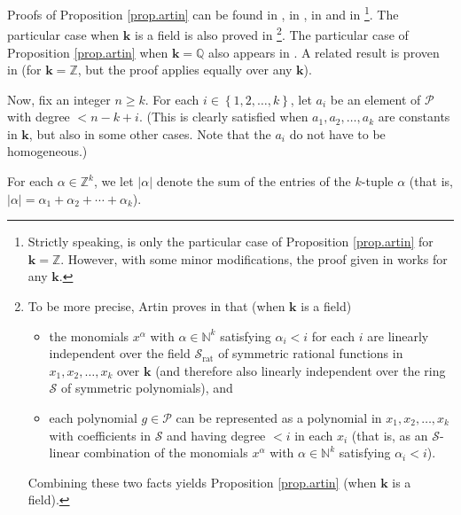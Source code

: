 \documentclass[numbers=enddot,12pt,final,onecolumn,notitlepage]{scrartcl}%
\theoremstyle{definition}
\begin{document}
Proofs of Proposition \ref{prop.artin} can be found in \cite[(DIFF.1.3)]%
{LLPT95}, in \cite[Chapter IV, \S 6, no. 1, Theorem 1 c)]{Bourba03}, in
\cite[Theorem, part (c)]{Gailla21} and in \cite[(5.1)]{Macdon91}%
\footnote{Strictly speaking, \cite[(5.1)]{Macdon91} is only the particular
case of Proposition \ref{prop.artin} for $\mathbf{k}=\mathbb{Z}$. However,
with some minor modifications, the proof given in \cite{Macdon91} works for
any $\mathbf{k}$.}. The particular case when $\mathbf{k}$ is a field is also
proved in \cite[result shown at the end of \S II.G]{Artin71}\footnote{To be
more precise, Artin proves in \cite[\S II.G, Example 2]{Artin71} that (when
$\mathbf{k}$ is a field)
\par
\begin{itemize}
\item the monomials $x^{\alpha}$ with $\alpha\in\mathbb{N}^{k}$ satisfying
$\alpha_{i}<i$ for each $i$ are linearly independent over the field
$\mathcal{S}_{\operatorname*{rat}}$ of symmetric rational functions in
$x_{1},x_{2},\ldots,x_{k}$ over $\mathbf{k}$ (and therefore also linearly
independent over the ring $\mathcal{S}$ of symmetric polynomials), and
\par
\item each polynomial $g\in\mathcal{P}$ can be represented as a polynomial in
$x_{1},x_{2},\ldots,x_{k}$ with coefficients in $\mathcal{S}$ and having
degree $<i$ in each $x_{i}$ (that is, as an $\mathcal{S}$-linear combination
of the monomials $x^{\alpha}$ with $\alpha\in\mathbb{N}^{k}$ satisfying
$\alpha_{i}<i$).
\end{itemize}
\par
Combining these two facts yields Proposition \ref{prop.artin} (when
$\mathbf{k}$ is a field).}. The particular case of Proposition
\ref{prop.artin} when $\mathbf{k}=\mathbb{Q}$ also appears in \cite[Remark
3.2]{Garsia02}. A related result is proven in \cite[Proposition 3.4]{FoGePo97}
(for $\mathbf{k}=\mathbb{Z}$, but the proof applies equally over any
$\mathbf{k}$).

Now, fix an integer $n\geq k$. For each $i\in\left\{  1,2,\ldots,k\right\}  $,
let $a_{i}$ be an element of $\mathcal{P}$ with degree $<n-k+i$. (This is
clearly satisfied when $a_{1},a_{2},\ldots,a_{k}$ are constants in
$\mathbf{k}$, but also in some other cases. Note that the $a_{i}$ do not have
to be homogeneous.)

For each $\alpha\in\mathbb{Z}^{k}$, we let $\left\vert \alpha\right\vert $
denote the sum of the entries of the $k$-tuple $\alpha$ (that is, $\left\vert
\alpha\right\vert =\alpha_{1}+\alpha_{2}+\cdots+\alpha_{k}$).
\end{document}
